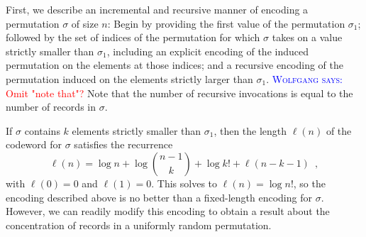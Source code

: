 \documentclass{patmorin}
\newcommand{\aremark}[3]{\textcolor{blue}{\textsc{#1 #2:}}
  \textcolor{red}{\textsf{#3}}}
\newcommand{\wolfgang}[2][says]{\aremark{Wolfgang}{#1}{#2}}
\begin{document}
First, we describe an incremental and recursive manner of encoding a
permutation $\sigma$ of size $n$: Begin by providing the first value
of the permutation $\sigma_1$; followed by the set of indices of the
permutation for which $\sigma$ takes on a value strictly smaller than
$\sigma_1$, including an explicit encoding of the induced permutation
on the elements at those indices; and a recursive encoding of the
permutation induced on the elements strictly larger than $\sigma_1$.
\wolfgang{Omit "note that"?}
Note that the number of recursive invocations is equal to the
number of records in $\sigma$.

If $\sigma$ contains $k$ elements strictly smaller than $\sigma_1$,
then the length $\ell(n)$ of the codeword for $\sigma$ satisfies the
recurrence
\[
  \ell(n) = \log n + \log \binom{n - 1}{k} + \log k! + \ell(n - k - 1) \enspace ,
\]
with $\ell(0) = 0$ and $\ell(1) = 0$. This solves to $\ell(n) = \log
n!$, so the encoding described above is no better than a fixed-length
encoding for $\sigma$. However, we can readily modify this encoding to
obtain a result about the concentration of records in a uniformly
random permutation.
\end{document}
